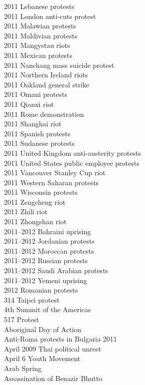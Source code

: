 2011 Lebanese protests\\
2011 London anti-cuts protest\\
2011 Malawian protests\\
2011 Maldivian protests\\
2011 Mangystau riots\\
2011 Mexican protests\\
2011 Nanchang mass suicide protest\\
2011 Northern Ireland riots\\
2011 Oakland general strike\\
2011 Omani protests\\
2011 Qianxi riot\\
2011 Rome demonstration\\
2011 Shanghai riot\\
2011 Spanish protests\\
2011 Sudanese protests\\
2011 United Kingdom anti-austerity protests\\
2011 United States public employee protests\\
2011 Vancouver Stanley Cup riot\\
2011 Western Saharan protests\\
2011 Wisconsin protests\\
2011 Zengcheng riot\\
2011 Zhili riot\\
2011 Zhongshan riot\\
2011–2012 Bahraini uprising\\
2011–2012 Jordanian protests\\
2011–2012 Moroccan protests\\
2011–2012 Russian protests\\
2011–2012 Saudi Arabian protests\\
2011–2012 Yemeni uprising\\
2012 Romanian protests\\
314 Taipei protest\\
4th Summit of the Americas\\
517 Protest\\
Aboriginal Day of Action\\
Anti-Roma protests in Bulgaria 2011\\
April 2009 Thai political unrest\\
April 6 Youth Movement\\
Arab Spring\\
Assassination of Benazir Bhutto\\
